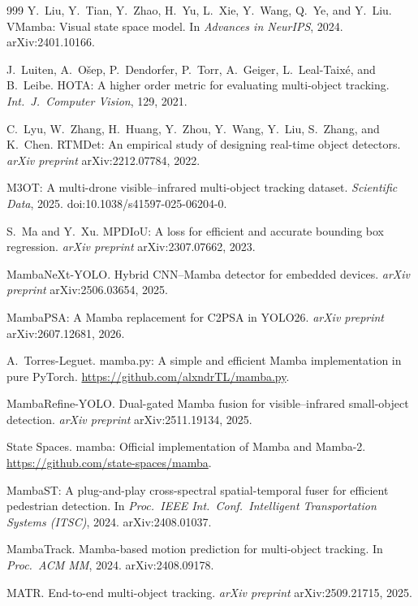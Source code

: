 \begin{thebibliography}{999}
Y.~Liu, Y.~Tian, Y.~Zhao, H.~Yu, L.~Xie, Y.~Wang, Q.~Ye, and Y.~Liu.
VMamba: Visual state space model.
In \textit{Advances in NeurIPS}, 2024. arXiv:2401.10166.

J.~Luiten, A.~O\v{s}ep, P.~Dendorfer, P.~Torr, A.~Geiger, L.~Leal-Taix\'e, and B.~Leibe.
HOTA: A higher order metric for evaluating multi-object tracking.
\textit{Int.\ J.\ Computer Vision}, 129, 2021.

C.~Lyu, W.~Zhang, H.~Huang, Y.~Zhou, Y.~Wang, Y.~Liu, S.~Zhang, and K.~Chen.
RTMDet: An empirical study of designing real-time object detectors.
\textit{arXiv preprint} arXiv:2212.07784, 2022.

M3OT: A multi-drone visible--infrared multi-object tracking dataset.
\textit{Scientific Data}, 2025. doi:10.1038/s41597-025-06204-0.

S.~Ma and Y.~Xu.
MPDIoU: A loss for efficient and accurate bounding box regression.
\textit{arXiv preprint} arXiv:2307.07662, 2023.

MambaNeXt-YOLO. Hybrid CNN--Mamba detector for embedded devices.
\textit{arXiv preprint} arXiv:2506.03654, 2025.

MambaPSA: A Mamba replacement for C2PSA in YOLO26.
\textit{arXiv preprint} arXiv:2607.12681, 2026.

A.~Torres-Leguet.
mamba.py: A simple and efficient Mamba implementation in pure PyTorch.
\url{https://github.com/alxndrTL/mamba.py}.

MambaRefine-YOLO. Dual-gated Mamba fusion for visible--infrared small-object
detection. \textit{arXiv preprint} arXiv:2511.19134, 2025.

State Spaces.
mamba: Official implementation of Mamba and Mamba-2.
\url{https://github.com/state-spaces/mamba}.

MambaST: A plug-and-play cross-spectral spatial-temporal fuser for efficient
pedestrian detection. In \textit{Proc.\ IEEE Int.\ Conf.\ Intelligent
Transportation Systems (ITSC)}, 2024. arXiv:2408.01037.

MambaTrack. Mamba-based motion prediction for multi-object tracking.
In \textit{Proc.\ ACM MM}, 2024. arXiv:2408.09178.

MATR. End-to-end multi-object tracking.
\textit{arXiv preprint} arXiv:2509.21715, 2025.


\end{thebibliography}
